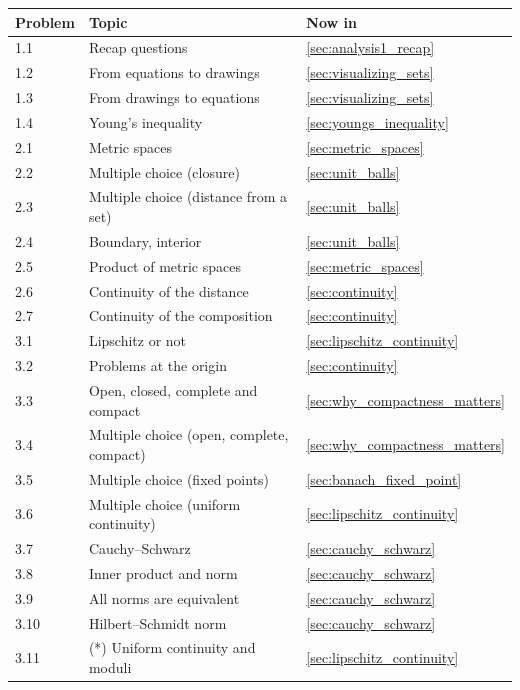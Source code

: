 \begin{center}
\begin{tabular}{@{}l l l@{}}
\textbf{Problem} & \textbf{Topic} & \textbf{Now in} \\
\hline
1.1 & Recap questions          & \cref{sec:analysis1_recap} \\
1.2 & From equations to drawings & \cref{sec:visualizing_sets} \\
1.3 & From drawings to equations & \cref{sec:visualizing_sets} \\
1.4 & Young's inequality       & \cref{sec:youngs_inequality} \\[4pt]
2.1 & Metric spaces            & \cref{sec:metric_spaces} \\
2.2 & Multiple choice (closure) & \cref{sec:unit_balls} \\
2.3 & Multiple choice (distance from a set) & \cref{sec:unit_balls} \\
2.4 & Boundary, interior       & \cref{sec:unit_balls} \\
2.5 & Product of metric spaces & \cref{sec:metric_spaces} \\
2.6 & Continuity of the distance & \cref{sec:continuity} \\
2.7 & Continuity of the composition & \cref{sec:continuity} \\[4pt]
3.1 & Lipschitz or not         & \cref{sec:lipschitz_continuity} \\
3.2 & Problems at the origin   & \cref{sec:continuity} \\
3.3 & Open, closed, complete and compact & \cref{sec:why_compactness_matters} \\
3.4 & Multiple choice (open, complete, compact) & \cref{sec:why_compactness_matters} \\
3.5 & Multiple choice (fixed points) & \cref{sec:banach_fixed_point} \\
3.6 & Multiple choice (uniform continuity) & \cref{sec:lipschitz_continuity} \\
3.7 & Cauchy--Schwarz          & \cref{sec:cauchy_schwarz} \\
3.8 & Inner product and norm   & \cref{sec:cauchy_schwarz} \\
3.9 & All norms are equivalent & \cref{sec:cauchy_schwarz} \\
3.10 & Hilbert--Schmidt norm   & \cref{sec:cauchy_schwarz} \\
3.11 & (*) Uniform continuity and moduli & \cref{sec:lipschitz_continuity} \\
\end{tabular}
\end{center}

